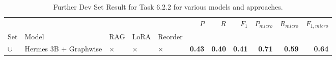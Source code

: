 \begin{table}
\caption{Further Dev Set Result for Task 6.2.2 for various models and approaches.}
\label{tab:task:6_2_2:test:ontug}
\begin{tabular}{lllllrrrrrr}
\toprule
 &  &  &  &  & $P$ & $R$ & $F_1$ & $P_{micro}$ & $R_{micro}$ & $F_{1,micro}$ \\
Set & Model & RAG & LoRA & Reorder &  &  &  &  &  &  \\
\midrule
$\cup$ & Hermes 3B + Graphwise & $\times$ & $\times$ & $\times$ & \textbf{0.43} & \textbf{0.40} & \textbf{0.41} & \textbf{0.71} & \textbf{0.59} & \textbf{0.64} \\
\cline{1-11} \cline{2-11} \cline{3-11} \cline{4-11} \cline{5-11}
\bottomrule
\end{tabular}
\end{table}
